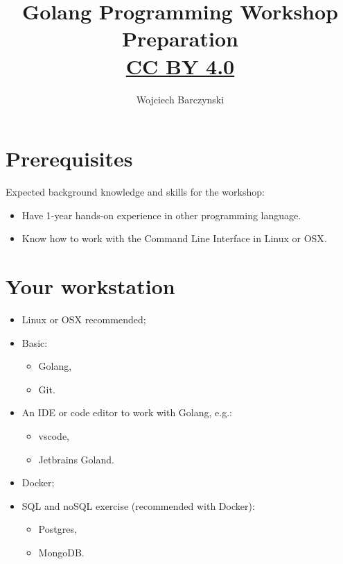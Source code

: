 \documentclass[11pt, letterpaper]{article}
\title{Golang Programming Workshop\\Preparation\\{ \small \href{https://creativecommons.org/licenses/by/4.0/}{CC BY 4.0} }  }
\author{Wojciech Barczynski}
\date{}
\begin{document}

\begin{titlepage}
\maketitle
\end{titlepage}

\tableofcontents
\pagebreak
\section{Prerequisites}

Expected background knowledge and skills for the workshop:

\begin{itemize}%
\item Have 1-year hands-on experience in other programming language.%
\item Know how to work with the Command Line Interface in Linux or {\small OSX}.
\end{itemize}%

\section{Your workstation}

\begin{itemize}%
\item Linux or {\small OSX} recommended;%
\item Basic: \begin{itemize}%
    \item Golang,
    \item Git.
    \end{itemize}%
\item An IDE or code editor to work with Golang, e.g.: \begin{itemize}%
    \item vscode,
    \item Jetbrains Goland.
    \end{itemize}%
\item Docker;
\item {\small SQL} and no{\small SQL} exercise (recommended with Docker):
\begin{itemize}%
    \item Postgres,
    \item MongoDB.
\end{itemize}%
\end{itemize}%
\end{document}
